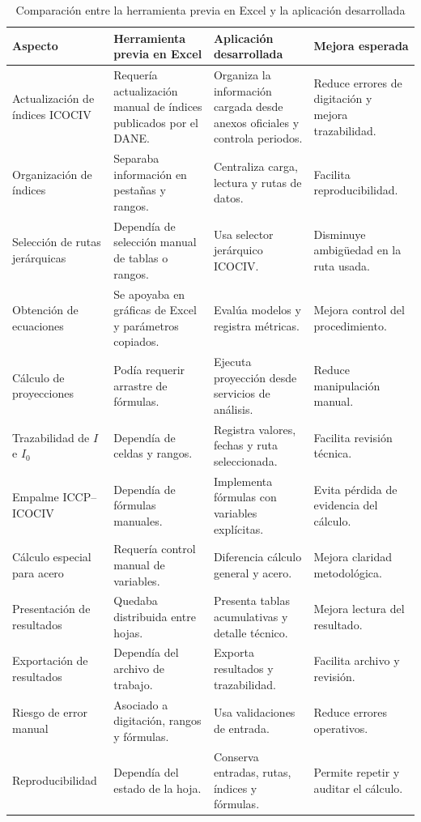 \documentclass[12pt,letterpaper]{article}
\newcommand{\ICOCIV}{ICOCIV}
\newcommand{\ICCP}{ICCP}
\newcommand{\DANE}{DANE}
\begin{document}
\begin{table}[H]
\centering
\caption{Comparación entre la herramienta previa en Excel y la aplicación desarrollada}
\label{tab:excel_vs_app}
\vspace{\baselineskip}
\scriptsize
\begin{adjustbox}{max width=\textwidth}
\begin{tabularx}{\textwidth}{@{}p{3.1cm}YYY@{}}
\toprule
\textbf{Aspecto} & \textbf{Herramienta previa en Excel} & \textbf{Aplicación desarrollada} & \textbf{Mejora esperada} \\
\midrule
Actualización de índices \ICOCIV{} & Requería actualización manual de índices publicados por el \DANE. & Organiza la información cargada desde anexos oficiales y controla periodos. & Reduce errores de digitación y mejora trazabilidad. \\
Organización de índices & Separaba información en pestañas y rangos. & Centraliza carga, lectura y rutas de datos. & Facilita reproducibilidad. \\
Selección de rutas jerárquicas & Dependía de selección manual de tablas o rangos. & Usa selector jerárquico \ICOCIV. & Disminuye ambigüedad en la ruta usada. \\
Obtención de ecuaciones & Se apoyaba en gráficas de Excel y parámetros copiados. & Evalúa modelos y registra métricas. & Mejora control del procedimiento. \\
Cálculo de proyecciones & Podía requerir arrastre de fórmulas. & Ejecuta proyección desde servicios de análisis. & Reduce manipulación manual. \\
Trazabilidad de \(I\) e \(I_0\) & Dependía de celdas y rangos. & Registra valores, fechas y ruta seleccionada. & Facilita revisión técnica. \\
Empalme \ICCP--\ICOCIV{} & Dependía de fórmulas manuales. & Implementa fórmulas con variables explícitas. & Evita pérdida de evidencia del cálculo. \\
Cálculo especial para acero & Requería control manual de variables. & Diferencia cálculo general y acero. & Mejora claridad metodológica. \\
Presentación de resultados & Quedaba distribuida entre hojas. & Presenta tablas acumulativas y detalle técnico. & Mejora lectura del resultado. \\
Exportación de resultados & Dependía del archivo de trabajo. & Exporta resultados y trazabilidad. & Facilita archivo y revisión. \\
Riesgo de error manual & Asociado a digitación, rangos y fórmulas. & Usa validaciones de entrada. & Reduce errores operativos. \\
Reproducibilidad & Dependía del estado de la hoja. & Conserva entradas, rutas, índices y fórmulas. & Permite repetir y auditar el cálculo. \\
\bottomrule
\end{tabularx}
\end{adjustbox}
\end{table}
\end{document}
